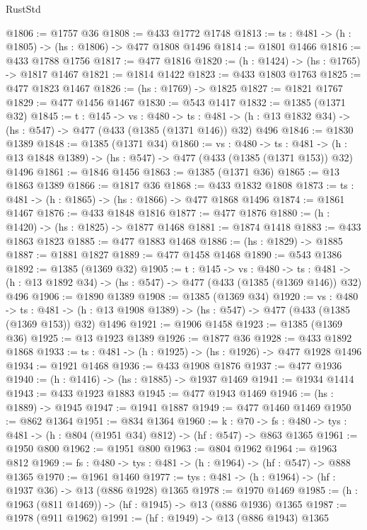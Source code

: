 \begin{lexlean}{RustStd}
\begin{coremodule}
@1806 := @1757 @36
@1808 := @433 @1772 @1748
@1813 := {ts : @481} -> (h : @1805) -> (hs : @1806) -> @477 @1808 @1496
@1814 := @1801 @1466
@1816 := @433 @1788 @1756
@1817 := @477 @1816
@1820 := (h : @1424) -> (hs : @1765) -> @1817 @1467
@1821 := @1814 @1422
@1823 := @433 @1803 @1763
@1825 := @477 @1823 @1467
@1826 := (hs : @1769) -> @1825
@1827 := @1821 @1767
@1829 := @477 @1456 @1467
@1830 := @543 @1417
@1832 := @1385 (@1371 @32)
@1845 := {t : @145} ->
  {vs : @480} ->
  {ts : @481} -> (h : @13 @1832 @34) -> (hs : @547) -> @477 (@433 (@1385 (@1371 @146)) @32) @496
@1846 := @1830 @1389
@1848 := @1385 (@1371 @34)
@1860 := {vs : @480} ->
  {ts : @481} -> (h : @13 @1848 @1389) -> (hs : @547) -> @477 (@433 (@1385 (@1371 @153)) @32) @1496
@1861 := @1846 @1456
@1863 := @1385 (@1371 @36)
@1865 := @13 @1863 @1389
@1866 := @1817 @36
@1868 := @433 @1832 @1808
@1873 := {ts : @481} -> (h : @1865) -> (hs : @1866) -> @477 @1868 @1496
@1874 := @1861 @1467
@1876 := @433 @1848 @1816
@1877 := @477 @1876
@1880 := (h : @1420) -> (hs : @1825) -> @1877 @1468
@1881 := @1874 @1418
@1883 := @433 @1863 @1823
@1885 := @477 @1883 @1468
@1886 := (hs : @1829) -> @1885
@1887 := @1881 @1827
@1889 := @477 @1458 @1468
@1890 := @543 @1386
@1892 := @1385 (@1369 @32)
@1905 := {t : @145} ->
  {vs : @480} ->
  {ts : @481} -> (h : @13 @1892 @34) -> (hs : @547) -> @477 (@433 (@1385 (@1369 @146)) @32) @496
@1906 := @1890 @1389
@1908 := @1385 (@1369 @34)
@1920 := {vs : @480} ->
  {ts : @481} -> (h : @13 @1908 @1389) -> (hs : @547) -> @477 (@433 (@1385 (@1369 @153)) @32) @1496
@1921 := @1906 @1458
@1923 := @1385 (@1369 @36)
@1925 := @13 @1923 @1389
@1926 := @1877 @36
@1928 := @433 @1892 @1868
@1933 := {ts : @481} -> (h : @1925) -> (hs : @1926) -> @477 @1928 @1496
@1934 := @1921 @1468
@1936 := @433 @1908 @1876
@1937 := @477 @1936
@1940 := (h : @1416) -> (hs : @1885) -> @1937 @1469
@1941 := @1934 @1414
@1943 := @433 @1923 @1883
@1945 := @477 @1943 @1469
@1946 := (hs : @1889) -> @1945
@1947 := @1941 @1887
@1949 := @477 @1460 @1469
@1950 := @862 @1364
@1951 := @834 @1364
@1960 := {k : @70} ->
  {fs : @480} -> {tys : @481} -> (h : @804 (@1951 @34) @812) -> (hf : @547) -> @863 @1365
@1961 := @1950 @800
@1962 := @1951 @800
@1963 := @804 @1962
@1964 := @1963 @812
@1969 := {fs : @480} -> {tys : @481} -> (h : @1964) -> (hf : @547) -> @888 @1365
@1970 := @1961 @1460
@1977 := {tys : @481} -> (h : @1964) -> (hf : @1937 @36) -> @13 (@886 @1928) @1365
@1978 := @1970 @1469
@1985 := (h : @1963 (@811 @1469)) -> (hf : @1945) -> @13 (@886 @1936) @1365
@1987 := @1978 (@911 @1962)
@1991 := (hf : @1949) -> @13 (@886 @1943) @1365

\end{coremodule}
\end{lexlean}

